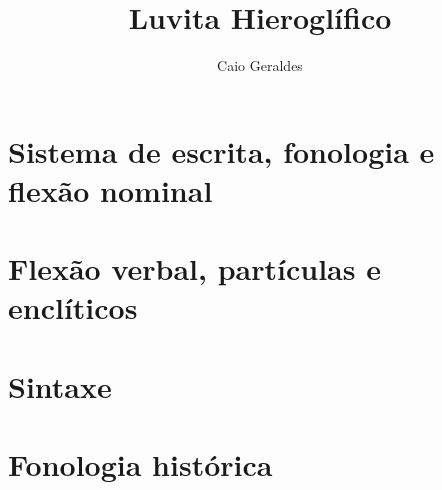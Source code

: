 \documentclass[a4paper,12pt]{memoir}
\title{Luvita Hieroglífico}
\author{Caio Geraldes}
\begin{document}
\setlength{\Exlabelsep}{0.5em}
\setlength{\SubExleftmargin}{1.5em}

\frontmatter

\thecoverpage%
\cleardoublepage%
\thetitlepage%


\cleardoublepage%


\cleardoublepage%
\tableofcontents*

\cleardoublepage%
\listoffigures*

\mainmatter%




\chapter{Sistema de escrita, fonologia e flexão nominal}


\chapter{Flexão verbal, partículas e enclíticos}


\chapter{Sintaxe}


\chapter{Fonologia histórica}


\backmatter%






%
%



\printbibliography%

\cleardoublepage%

\colofao{}
\end{document}
